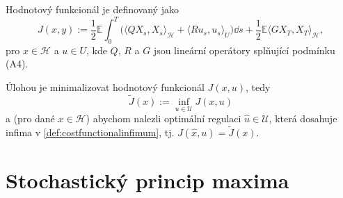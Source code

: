 Hodnotový funkcionál je definovaný jako
\begin{equation}
    J (x,y) := \frac{1}{2}\mathbb{E}\int_0^T \big( \langle Q X_s,
    X_s \rangle_\mathscr{H} + \langle R u_s, u_s\rangle_U \big) \dd s +
    \frac{1}{2} \mathbb{E} \langle G X_T, X_T \rangle_\mathscr{H},
    \label{def:costfunctional}
\end{equation}
pro $x\in\mathscr{H}$ a $u\in U$, kde $Q$, $R$ a $G$ jsou lineární
operátory splňující podmínku (A4).

Úlohou je minimalizovat hodnotový funkcionál $J(x,u)$, tedy
\begin{equation}
    \tilde{J}(x) := \inf_{u\in\mathscr{U}} J(x,u)
    \label{def:costfunctionalinfimum}
\end{equation}
a (pro dané $x\in\mathscr{H}$) abychom nalezli optimální regulaci
$\hat{u}\in\mathscr{U}$, která dosahuje infima v
\eqref{def:costfunctionalinfimum}, tj. $J(\hat{x},u) = \tilde{J}(x)$.

\section{Stochastický princip maxima}
